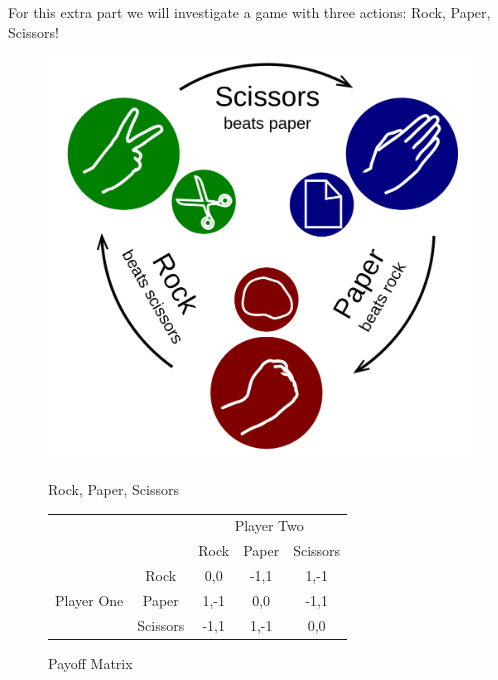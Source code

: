 \documentclass[a4paper, 11pt]{article}
\begin{document}
For this extra part we will investigate a game with three actions: Rock, Paper, Scissors!

\begin{figure}[H]
  \begin{minipage}[b]{0.40\linewidth}
\includegraphics[width=1\linewidth]{Rock-paper-scissors}
\caption{Rock, Paper, Scissors}
  \end{minipage}%
  \begin{minipage}[b]{0.60\linewidth}
    \centering%
\begin{tabular}{cc|c|c|c|}
\cline{3-5}
                                                  &          & \multicolumn{3}{c|}{Player Two} \\ \cline{3-5} 
                                                  &          & Rock    & Paper    & Scissors   \\ \hline
\multicolumn{1}{|c|}{\multirow{3}{*}{Player One}} & Rock     & 0,0     & -1,1     & 1,-1       \\ \cline{2-5} 
\multicolumn{1}{|c|}{}                            & Paper    & 1,-1    & 0,0      & -1,1       \\ \cline{2-5} 
\multicolumn{1}{|c|}{}                            & Scissors & -1,1    & 1,-1     & 0,0        \\ \hline
\end{tabular}
\caption{Payoff Matrix}
    \par\vspace{0pt}
  \end{minipage}
\end{figure}
\end{document}
